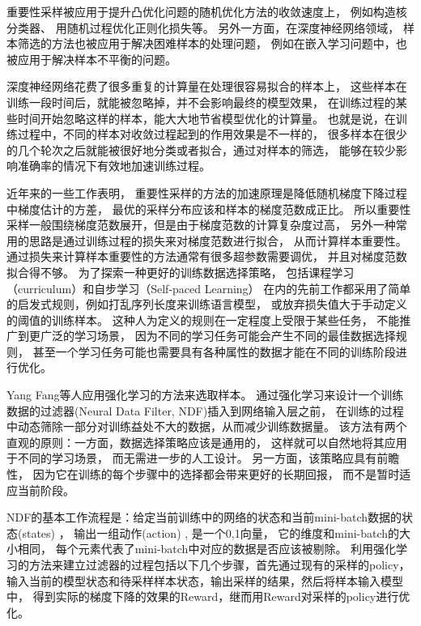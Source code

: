   重要性采样被应用于提升凸优化问题的随机优化方法的收敛速度上，
  例如构造核分类器\cite{bordes2005fast}、
  用随机过程优化正则化损失\cite{zhao2015stochastic}等。
  另外一方面，在深度神经网络领域，
  样本筛选的方法也被应用于解决困难样本的处理问题，
  例如在嵌入学习问题中\cite{wu2017sampling}，也被应用于解决样本不平衡的问题。

  深度神经网络花费了很多重复的计算量在处理很容易拟合的样本上，
  这些样本在训练一段时间后，就能被忽略掉，并不会影响最终的模型效果，
  在训练过程的某些时间开始忽略这样的样本，能大大地节省模型优化的计算量。
  也就是说，在训练过程中，不同的样本对收敛过程起到的作用效果是不一样的，
  很多样本在很少的几个轮次之后就能被很好地分类或者拟合，通过对样本的筛选，
  能够在较少影响准确率的情况下有效地加速训练过程。

  近年来的一些工作表明\cite{needell2014stochastic}，
  重要性采样的方法的加速原理是降低随机梯度下降过程中梯度估计的方差，
  最优的采样分布应该和样本的梯度范数成正比。
  所以重要性采样一般围绕梯度范数展开，但是由于梯度范数的计算复杂度过高，
  另外一种常用的思路是通过训练过程的损失来对梯度范数进行拟合，
  从而计算样本重要性。
  通过损失来计算样本重要性的方法通常有很多超参数需要调优，
  并且对梯度范数拟合得不够。
  为了探索一种更好的训练数据选择策略，
  包括课程学习（curriculum）和自步学习（Self-paced Learning）
  在内的先前工作都采用了简单的启发式规则，例如打乱序列长度来训练语言模型，
  或放弃损失值大于手动定义的阈值的训练样本。
  这种人为定义的规则在一定程度上受限于某些任务，
  不能推广到更广泛的学习场景，
  因为不同的学习任务可能会产生不同的最佳数据选择规则，
  甚至一个学习任务可能也需要具有各种属性的数据才能在不同的训练阶段进行优化。

  Yang Fang等人应用强化学习的方法来选取样本\cite{fan2016neural}。
  通过强化学习来设计一个训练数据的过滤器(Neural Data Filter, NDF)插入到网络输入层之前，
  在训练的过程中动态筛除一部分对训练益处不大的数据，从而减少训练数据量。
  该方法有两个直观的原则：一方面，数据选择策略应该是通用的，
  这样就可以自然地将其应用于不同的学习场景，
  而无需进一步的人工设计。 另一方面，该策略应具有前瞻性，
  因为它在训练的每个步骤中的选择都会带来更好的长期回报，
  而不是暂时适应当前阶段。

  NDF的基本工作流程是：给定当前训练中的网络的状态和当前mini-batch数据的状态(states)   ，
  输出一组动作(action) ,  是一个0,1向量，
  它的维度和mini-batch的大小相同，
  每个元素代表了mini-batch中对应的数据是否应该被剔除。
  利用强化学习的方法来建立过滤器的过程包括以下几个步骤，首先通过现有的采样的policy，
  输入当前的模型状态和待采样样本状态，输出采样的结果，然后将样本输入模型中，
  得到实际的梯度下降的效果的Reward，继而用Reward对采样的policy进行优化。

